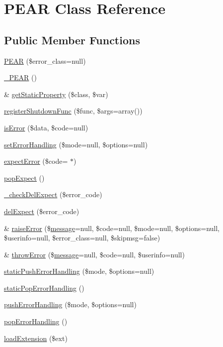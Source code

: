 \hypertarget{classPEAR}{}\section{P\+E\+AR Class Reference}
\label{classPEAR}
\subsection*{Public Member Functions}
\begin{DoxyCompactItemize}
\item 
\hyperlink{classPEAR_a1dc6fd8c04eca33173cc78556178b980}{P\+E\+AR} (\$error\+\_\+class=null)
\item 
\hyperlink{classPEAR_a282c57b5152ef70d02b3f08ad826af0a}{\+\_\+\+P\+E\+AR} ()
\item 
\& \hyperlink{classPEAR_ac189aee05eb30e8926a952cdf8eb9d02}{get\+Static\+Property} (\$class, \$var)
\item 
\hyperlink{classPEAR_aa2575aa1fe7e5b46b99c35aaa367b04c}{register\+Shutdown\+Func} (\$func, \$args=array())
\item 
\hyperlink{classPEAR_aa2608099ea852b3e982928aab10482ba}{is\+Error} (\$data, \$code=null)
\item 
\hyperlink{classPEAR_abb8e73d9d49ad896205667c412332ffb}{set\+Error\+Handling} (\$mode=null, \$options=null)
\item 
\hyperlink{classPEAR_a99f53f3623ab2fdbb046d85711e36a65}{expect\+Error} (\$code=\textquotesingle{} $\ast$\textquotesingle{})
\item 
\hyperlink{classPEAR_a3ea2df43e39214a29f77f8773a5afcc4}{pop\+Expect} ()
\item 
\hyperlink{classPEAR_a6350d6f88347be3704dc5967915a7ada}{\+\_\+check\+Del\+Expect} (\$error\+\_\+code)
\item 
\hyperlink{classPEAR_a8aa91fd0c4d61435587519c0417848c5}{del\+Expect} (\$error\+\_\+code)
\item 
\& \hyperlink{classPEAR_add7f8b82b573935527decd2e1af6065d}{raise\+Error} (\$\hyperlink{classmessage}{message}=null, \$code=null, \$mode=null, \$options=null, \$userinfo=null, \$error\+\_\+class=null, \$skipmsg=false)
\item 
\& \hyperlink{classPEAR_a146f08ee812450913835040d43b2c832}{throw\+Error} (\$\hyperlink{classmessage}{message}=null, \$code=null, \$userinfo=null)
\item 
\hyperlink{classPEAR_a5bfc268ba255bb88c2f98bb5f9f0a124}{static\+Push\+Error\+Handling} (\$mode, \$options=null)
\item 
\hyperlink{classPEAR_ad558eaf2cadc1eb2afa180f7a75bcab3}{static\+Pop\+Error\+Handling} ()
\item 
\hyperlink{classPEAR_a44c791bbf9e490da1b053dcd075fd285}{push\+Error\+Handling} (\$mode, \$options=null)
\item 
\hyperlink{classPEAR_adc1bc0e4afb5652ad5c42bbd82b7a353}{pop\+Error\+Handling} ()
\item 
\hyperlink{classPEAR_a0c1ee79fa15f1d8ac1b24686a3d3fe44}{load\+Extension} (\$ext)
\end{DoxyCompactItemize}
